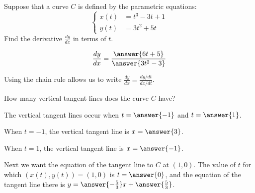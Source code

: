 \documentclass{ximera}
\author{Alex Beckwith}
\begin{document}
\begin{exercise}

Suppose that a curve $C$ is defined by the parametric equations:
\[
\begin{cases}
x(t) &=  t^3-3t+1\\
y(t) &= 3t^2+5t
\end{cases}
\]
Find the derivative $\frac{dy}{dx}$ in terms of $t$.

\[
\frac{dy}{dx} = \frac{\answer{6t+5}}{\answer{3t^2-3}}
\]

\begin{hint}
Using the chain rule allows us to write $\frac{dy}{dx} = \frac{dy/dt}{dx/dt}$.
\end{hint}

\begin{exercise}
How many vertical tangent lines does the curve $C$ have?
\begin{multipleChoice}
\end{multipleChoice}

The vertical tangent lines occur when $t=\answer{-1}$ and $t=\answer{1}$.

\begin{exercise}
When $t=-1$, the vertical tangent line is $x=\answer{3}$.

When $t=1$, the vertical tangent line is $x=\answer{-1}$.
\end{exercise}

\begin{exercise}
Next we want the equation of the tangent line to $C$ at $(1,0)$. The value of $t$ for which $(x(t),y(t))=(1,0)$ is $t=\answer{0}$, and the equation of the tangent line there is $y= \answer{-\frac{5}{3}}x+\answer{\frac{5}{3}}$.
\end{exercise}
\end{exercise}
\end{exercise}
\end{document}
